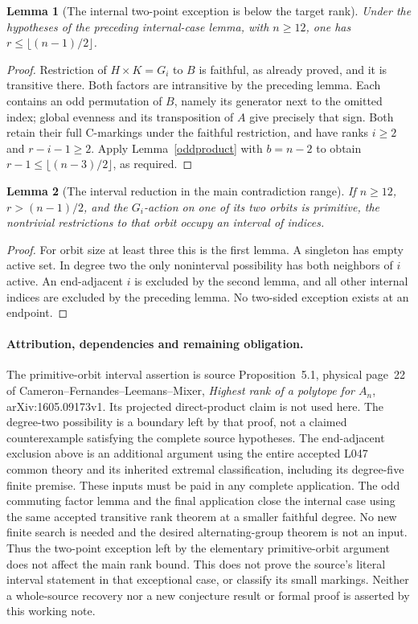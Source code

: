 \documentclass[11pt,a4paper]{article}
\newtheorem{lemma}{Lemma}
\begin{document}
\begin{lemma}[The internal two-point exception is below the target rank]
Under the hypotheses of the preceding internal-case lemma, with
$n\geq12$, one has $r\leq\lfloor(n-1)/2\rfloor$.
\end{lemma}
\begin{proof}
Restriction of $H\times K=G_i$ to $B$ is faithful, as already
proved, and it is transitive there. Both factors are intransitive
by the preceding lemma. Each contains an odd permutation of $B$,
namely its generator next to the omitted index; global evenness
and its transposition of $A$ give precisely that sign. Both retain
their full C-markings under the faithful restriction, and have
ranks $i\geq2$ and $r-i-1\geq2$. Apply Lemma~\ref{oddproduct}
with $b=n-2$ to obtain
$r-1\leq\lfloor(n-3)/2\rfloor$, as required.
\end{proof}

\begin{lemma}[The interval reduction in the main contradiction range]
If $n\geq12$, $r>(n-1)/2$, and the $G_i$-action on one of its
two orbits is primitive, the nontrivial restrictions to that orbit
occupy an interval of indices.
\end{lemma}
\begin{proof}
For orbit size at least three this is the first lemma. A singleton
has empty active set. In degree two the only noninterval possibility
has both neighbors of $i$ active. An end-adjacent $i$ is excluded by
the second lemma, and all other internal indices are excluded by
the preceding lemma. No two-sided exception exists at an endpoint.
\end{proof}

\paragraph{Attribution, dependencies and remaining obligation.}
The primitive-orbit interval assertion is source Proposition~5.1,
physical page~22 of Cameron--Fernandes--Leemans--Mixer,
\emph{Highest rank of a polytope for $A_n$}, arXiv:1605.09173v1.
Its projected direct-product claim is not used here. The degree-two
possibility is a boundary left by that proof, not a claimed
counterexample satisfying the complete source hypotheses.
The end-adjacent exclusion above is an additional argument using
the entire accepted L047 common theory and its inherited extremal
classification, including its degree-five finite premise. These
inputs must be paid in any complete application. The odd commuting
factor lemma and the final application close the internal case
using the same accepted transitive rank theorem at a smaller
faithful degree. No new finite search is needed and the desired
alternating-group theorem is not an input. Thus the two-point
exception left by the elementary primitive-orbit argument does not
affect the main rank bound. This does not prove the source's literal
interval statement in that exceptional case, or classify its small
markings. Neither a whole-source recovery nor a new conjecture
result or formal proof is asserted by this working note.
\end{document}
